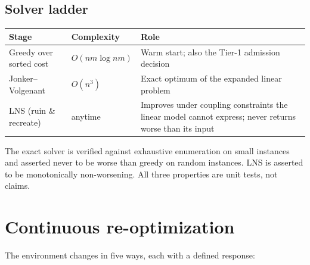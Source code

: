 \subsection{Solver ladder}

\begin{center}\footnotesize
\begin{tabular}{@{}llp{62mm}@{}}
\toprule
\textbf{Stage} & \textbf{Complexity} & \textbf{Role} \\
\midrule
Greedy over sorted cost & $O(nm\log nm)$ & Warm start; also the Tier-1 admission decision \\
Jonker--Volgenant & $O(n^3)$ & Exact optimum of the expanded linear problem \\
LNS (ruin \& recreate) & anytime & Improves under coupling constraints the linear model cannot express; never returns worse than its input \\
\bottomrule
\end{tabular}
\end{center}

\noindent The exact solver is verified against exhaustive enumeration on small
instances and asserted never to be worse than greedy on random instances. LNS
is asserted to be monotonically non-worsening. All three properties are
unit tests, not claims.

\begin{decbox}
\end{decbox}

\section{Continuous re-optimization}

The environment changes in five ways, each with a defined response:

